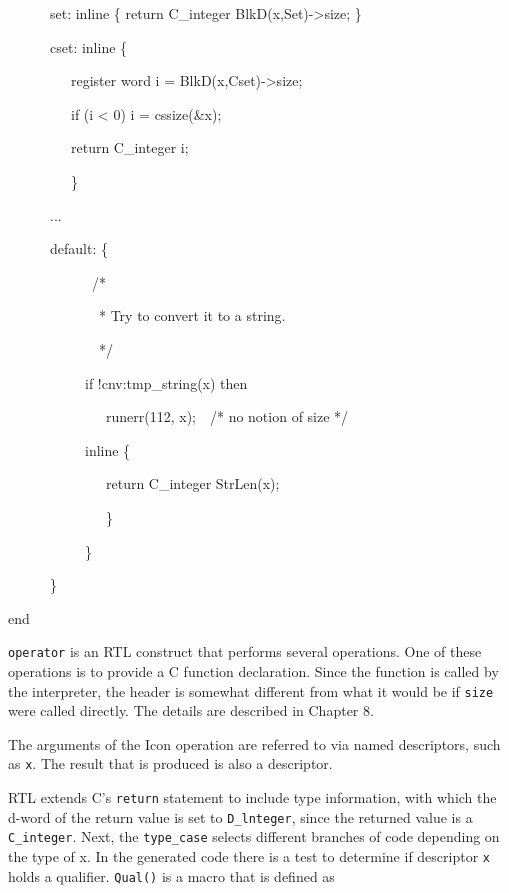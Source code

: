 {\ttfamily\mdseries
\ \ \ \ \ \ set: inline \{ return C\_integer BlkD(x,Set)-{\textgreater}size; \}}

{\ttfamily\mdseries
\ \ \ \ \ \ cset: inline \{}

{\ttfamily\mdseries
\ \ \ \ \ \ \ \ \ register word i = BlkD(x,Cset)-{\textgreater}size;}

{\ttfamily\mdseries
\ \ \ \ \ \ \ \ \ if (i {\textless} 0) i = cssize(\&x);}

{\ttfamily\mdseries
\ \ \ \ \ \ \ \ \ return C\_integer i;}

{\ttfamily\mdseries
\ \ \ \ \ \ \ \ \ \}}

{\ttfamily\mdseries
\ \ \ \ \ \ ...}

{\ttfamily\mdseries
\ \ \ \ \ \ default: \{}

{\ttfamily\mdseries
\ \ \ \ \ \ \ \ \ \ \ \ /*}

{\ttfamily\mdseries
\ \ \ \ \ \ \ \ \ \ \ \ \ * Try to convert it to a string.}

{\ttfamily\mdseries
\ \ \ \ \ \ \ \ \ \ \ \ \ */}

{\ttfamily\mdseries
\ \ \ \ \ \ \ \ \ \ \ if !cnv:tmp\_string(x) then}

{\ttfamily\mdseries
\ \ \ \ \ \ \ \ \ \ \ \ \ \ runerr(112, x);\ \ /* no notion of size */}

{\ttfamily\mdseries
\ \ \ \ \ \ \ \ \ \ \ inline \{}

{\ttfamily\mdseries
\ \ \ \ \ \ \ \ \ \ \ \ \ \ return C\_integer StrLen(x);}

{\ttfamily\mdseries
\ \ \ \ \ \ \ \ \ \ \ \ \ \ \}}


\ \ \ \ \ \ \ \ \ \ \ \}


\ \ \ \ \ \ \}

{\ttfamily
end}


\texttt{operator} is an RTL construct that performs several
operations. One of these operations is to provide a C function
declaration. Since the function is called by the interpreter, the
header is somewhat different from what it would be if \texttt{size}
were called directly. The details are described in Chapter 8.

The arguments of the Icon operation are referred to via named
descriptors, such as \texttt{x}. The result that is produced is also a
descriptor.

RTL extends C's \texttt{return} statement to include type information,
with which the d-word of the return value is set to
\texttt{D\_lnteger}, since the returned value is a
\texttt{C\_integer}. Next, the \texttt{type\_case} selects different
branches of code depending on the type of x. In the generated code
there is a test to determine if descriptor \texttt{x} holds a
qualifier. \texttt{Qual()} is a macro that is defined as

